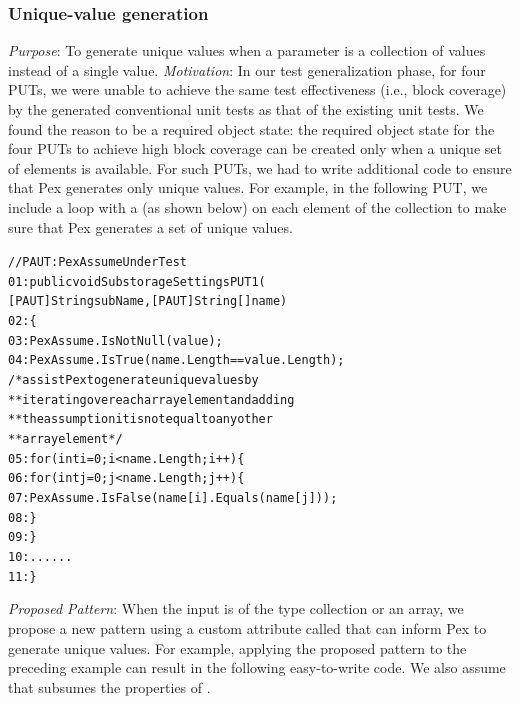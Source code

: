 \subsubsection{Unique-value generation}
\emph{Purpose}: To generate unique values when a parameter is a collection of values instead of a single value.
\newline
\emph{Motivation}: In our test generalization phase, for four PUTs, we were unable to achieve the same test effectiveness (i.e., block coverage) by the generated conventional unit tests as that of the existing unit tests. We found the reason to be a required object state: the required object state for the four PUTs to achieve high block coverage can be created only when a unique set of elements is available. For such PUTs, we had to write additional
code to ensure that Pex generates only unique values. For example, in the following PUT, we include a  loop with a  (as shown below) on each element of the collection to make sure that
Pex generates a set of unique values. 

\begin{CodeOut}
\begin{alltt}
//PAUT: PexAssumeUnderTest
01:public void SubstorageSettingsPUT1(
\hspace*{0.3in}[PAUT]String subName, [PAUT]String[] name)
02:\{
03:\hspace*{0.3in}PexAssume.IsNotNull(value); 
04:\hspace*{0.3in}PexAssume.IsTrue(name.Length == value.Length);
\hspace*{0.4in}/*assist Pex to generate unique values by 
							 **iterating over each array element and adding
							 **the assumption it is not equal to any other 
							 **array element*/
05:\hspace*{0.3in}for (int i = 0; i < name.Length; i++) \{
06:\hspace*{0.5in}for (int j = 0; j < name.Length; j++) \{
07:\hspace*{0.6in}PexAssume.IsFalse(name[i].Equals(name[j]));
08:\hspace*{0.5in}\}
09:\hspace*{0.3in}\}
10:\hspace*{0.1in}......
11:\}
\end{alltt}
\end{CodeOut}

\emph{Proposed Pattern}: When the input is of the type collection or an array, 
we propose a new pattern using a custom attribute called  that can inform
Pex to generate unique values. For example, applying the proposed pattern to the preceding example can
result in the following easy-to-write code. We also assume that 
 subsumes the properties of .

